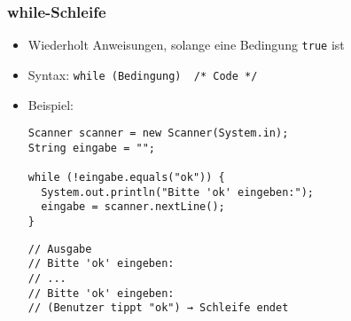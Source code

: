 \documentclass{../../presentation}
\begin{document}
\begin{frame}[fragile]
  \frametitle{while-Schleife}

  \begin{itemize}
    \item<1-> Wiederholt Anweisungen, solange eine Bedingung \texttt{true} ist    
    \item<1-> Syntax: \texttt{while (Bedingung) { /* Code */ }}
    \item<2-> Beispiel:
      \begin{verbatim}
Scanner scanner = new Scanner(System.in);
String eingabe = "";

while (!eingabe.equals("ok")) {
  System.out.println("Bitte 'ok' eingeben:");
  eingabe = scanner.nextLine();
}
      \end{verbatim}
      
      \begin{verbatim}
// Ausgabe
// Bitte 'ok' eingeben:
// ...
// Bitte 'ok' eingeben:
// (Benutzer tippt "ok") → Schleife endet
      \end{verbatim}
    
      \end{itemize}




  
\end{frame}
\end{document}
